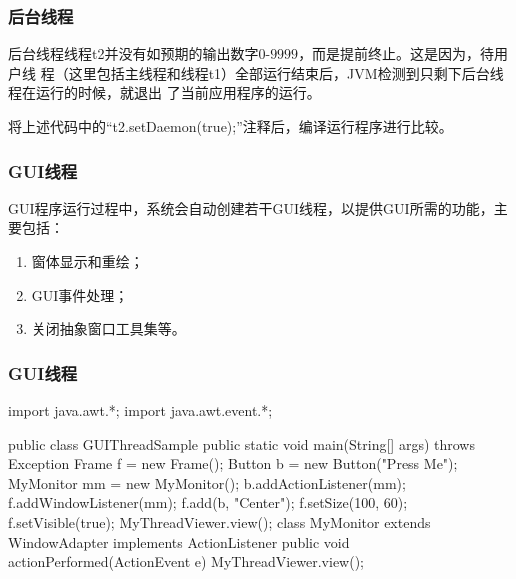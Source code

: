 \begin{frame}[fragile] %
\frametitle{后台线程}


{\Mage 后台线程线程t2并没有如预期的输出数字$0$-$9999$，而是提前终止。这是因为，待用户线
  程（这里包括主线程和线程t1）全部运行结束后，JVM检测到只剩下后台线程在运行的时候，就退出
  了当前应用程序的运行。}

将上述代码中的“t2.setDaemon(true);”注释后，编译运行程序进行比较。

\end{frame}

\begin{frame}[fragile] %
\frametitle{GUI线程}

GUI程序运行过程中，系统会自动创建若干GUI线程，以提供GUI所需的功能，主要包括：
\begin{enumerate}\Blue\kai
\item 窗体显示和重绘；
\item GUI事件处理；
\item 关闭抽象窗口工具集等。
\end{enumerate}
\end{frame}

\begin{frame}[fragile] %
\frametitle{GUI线程}

\begin{javaCode}
import java.awt.*;
import java.awt.event.*;

public class GUIThreadSample {
  public static void main(String[] args) throws Exception {
    Frame f = new Frame();
    Button b = new Button("Press Me");
    MyMonitor mm = new MyMonitor();
    b.addActionListener(mm);
    f.addWindowListener(mm);
    f.add(b, "Center");
    f.setSize(100, 60);
    f.setVisible(true);
    MyThreadViewer.view();
  }
}
class MyMonitor extends WindowAdapter implements ActionListener {
  public void actionPerformed(ActionEvent e) {
    MyThreadViewer.view();
  }
}
\end{javaCode}
\end{frame}


